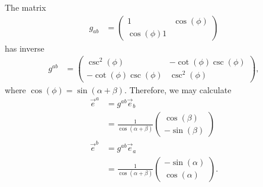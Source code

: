 \documentclass[10pt]{mypackage}
\begin{document}
\begin{solution}[30.5]
  The matrix
  \begin{align*}
    g_{ab} &= \begin{pmatrix}1 & \cos\left( \phi \right)\\\cos\left( \phi \right)1\end{pmatrix}
  \end{align*}
  has inverse
  \begin{align*}
    g^{ab} &= \begin{pmatrix}\csc^2\left( \phi \right) & -\cot\left( \phi \right)\csc\left( \phi \right) \\ -\cot\left( \phi \right)\csc\left( \phi \right) & \csc^2\left( \phi \right)\end{pmatrix},
  \end{align*}
  where $\cos\left( \phi \right) = \sin\left( \alpha + \beta \right)$. Therefore, we may calculate
  \begin{align*}
    \vec{e}^{a} &= g^{ab}\vec{e}_b\\
                &= \frac{1}{\cos\left( \alpha + \beta \right)} \begin{pmatrix}\cos\left( \beta \right)\\-\sin\left( \beta \right)\end{pmatrix}\\
    \vec{e}^{b} &= g^{ab}\vec{e}_a\\
                &= \frac{1}{\cos\left( \alpha + \beta \right)}\begin{pmatrix} -\sin\left( \alpha \right)\\\cos\left( \alpha \right) \end{pmatrix}.
  \end{align*}
\end{solution}
\end{document}
